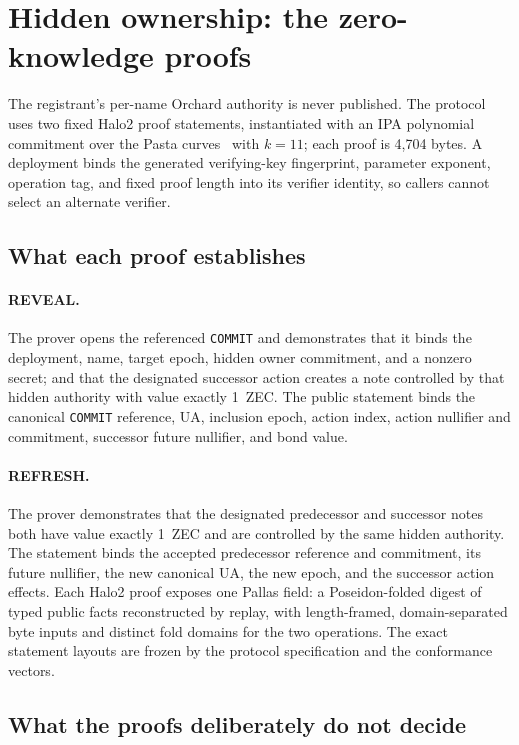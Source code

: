 \documentclass[11pt]{article}
\newcommand{\operation}[1]{\texttt{#1}}
\begin{document}
\section{Hidden ownership: the zero-knowledge proofs}
\label{sec:proofs}

The registrant's per-name Orchard authority is never published. The protocol
uses two fixed Halo2 proof statements, instantiated with an IPA polynomial
commitment over the Pasta curves~\cite{halo2-ipa} with $k=11$; each proof is
4,704 bytes. A deployment binds the generated verifying-key fingerprint,
parameter exponent, operation tag, and fixed proof length into its verifier
identity, so callers cannot select an alternate verifier.

\subsection{What each proof establishes}

\paragraph{REVEAL.} The prover opens the referenced \operation{COMMIT} and
demonstrates that it binds the deployment, name, target epoch, hidden owner
commitment, and a nonzero secret; and that the designated successor action
creates a note controlled by that hidden authority with value exactly 1~ZEC.
The public statement binds the canonical \operation{COMMIT} reference, UA,
inclusion epoch, action index, action nullifier and commitment, successor
future nullifier, and bond value.

\paragraph{REFRESH.} The prover demonstrates that the designated predecessor
and successor notes both have value exactly 1~ZEC and are controlled by the
same hidden authority. The statement binds the accepted predecessor reference
and commitment, its future nullifier, the new canonical UA, the new epoch,
and the successor action effects. Each Halo2 proof exposes one Pallas field:
a Poseidon-folded digest of typed public facts reconstructed by replay, with
length-framed, domain-separated byte inputs and distinct fold domains for the
two operations. The exact statement layouts are frozen by the protocol
specification and the conformance vectors.

\subsection{What the proofs deliberately do not decide}
\end{document}
